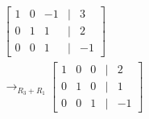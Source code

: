 \documentclass[preview]{standalone}
\begin{document}
\begin{align*}
\begin{bmatrix} 1 & 0 & -1 & | & 3 \\ 0 & 1 & 1 & | & 2 \\ 0 & 0 & 1 & | & -1 \end{bmatrix}\\ \rightarrow_{R_3 + R_1} \begin{bmatrix} 1 & 0 & 0 & | & 2 \\ 0 & 1 & 0 & | & 1 \\ 0 & 0 & 1 & | & -1 \end{bmatrix}
\end{align*}
\end{document}
